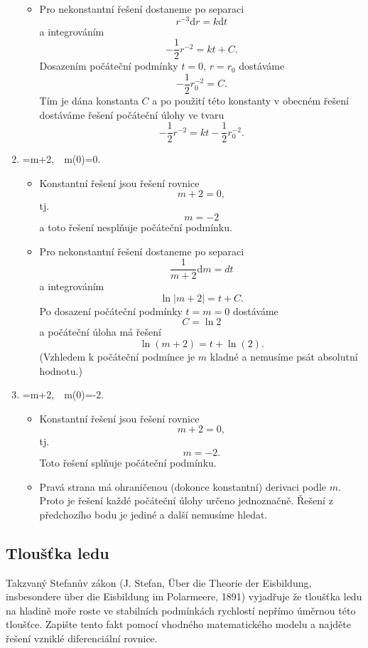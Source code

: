 \begin{enumerate}[(1)]
\begin{itemize}
  \item Pro nekonstantní řešení dostaneme po separaci  $$ r^{-3}\mathrm dr=k\mathrm dt $$ a integrováním $$ -\frac 12 r^{-2}=kt+C.$$ Dosazením počáteční podmínky $t=0$, $r=r_0$ dostáváme $$ -\frac 12 r_0^{-2}=C.$$ Tím je dána konstanta $C$ a po použití této konstanty v obecném řešení dostáváme řešení počáteční úlohy ve tvaru $$ -\frac 12 r^{-2}=kt-\frac 12 r_0^{-2}.$$
  \end{itemize}
\item \priklad {}=m+2,\ \ m(0)=0.
  \begin{itemize}
  \item Konstantní řešení jsou řešení rovnice $$ m+2=0,$$ tj. $$ m=-2$$ a toto řešení nesplňuje počáteční podmínku.
  \item Pro nekonstantní řešení dostaneme po separaci  $$ \frac1{m+2}\mathrm dm=dt $$ a integrováním $$ \ln|m+2|=t+C.$$ Po dosazení počáteční podmínky $t=m=0$ dostáváme $$C=\ln 2$$ a počáteční úloha má řešení $$\ln(m+2)=t+\ln (2).$$ (Vzhledem k počáteční podmínce je $m$ kladné a nemusíme psát absolutní hodnotu.)
  \end{itemize}
\item \priklad {}=m+2,\ \ m(0)=-2.
  \begin{itemize}
  \item Konstantní řešení jsou řešení rovnice $$ m+2=0,$$ tj. $$ m=-2.$$ Toto řešení splňuje počáteční podmínku.
  \item Pravá strana má ohraničenou (dokonce konstantní) derivaci podle $m$. Proto je řešení každé počáteční úlohy určeno jednoznačně. Řešení z předchozího bodu je jediné a další nemusíme hledat.
  \end{itemize}
\end{enumerate}

\konec

\subsection{Tloušťka ledu}

Takzvaný Stefanův zákon (J. Stefan, \"Uber die Theorie der Eisbildung, insbesondere \"uber die Eisbildung im Polarmeere, 1891) vyjadřuje že tloušťka ledu na hladině moře roste ve
stabilních podmínkách rychlostí nepřímo úměrnou této tloušťce. Zapište
tento fakt pomocí vhodného matematického modelu a najděte řešení
vzniklé diferenciální rovnice.

\reseni

